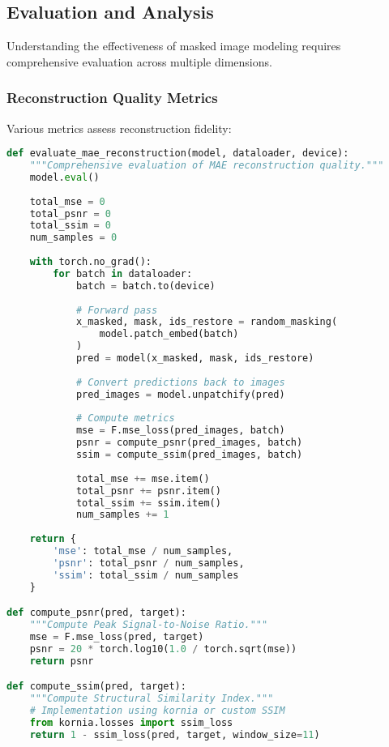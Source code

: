 \subsection{Evaluation and Analysis}

Understanding the effectiveness of masked image modeling requires comprehensive evaluation across multiple dimensions.

\subsubsection{Reconstruction Quality Metrics}

Various metrics assess reconstruction fidelity:

\begin{lstlisting}[language=Python, caption=Comprehensive evaluation of MAE reconstruction quality]
def evaluate_mae_reconstruction(model, dataloader, device):
    """Comprehensive evaluation of MAE reconstruction quality."""
    model.eval()
    
    total_mse = 0
    total_psnr = 0
    total_ssim = 0
    num_samples = 0
    
    with torch.no_grad():
        for batch in dataloader:
            batch = batch.to(device)
            
            # Forward pass
            x_masked, mask, ids_restore = random_masking(
                model.patch_embed(batch)
            )
            pred = model(x_masked, mask, ids_restore)
            
            # Convert predictions back to images
            pred_images = model.unpatchify(pred)
            
            # Compute metrics
            mse = F.mse_loss(pred_images, batch)
            psnr = compute_psnr(pred_images, batch)
            ssim = compute_ssim(pred_images, batch)
            
            total_mse += mse.item()
            total_psnr += psnr.item()
            total_ssim += ssim.item()
            num_samples += 1
    
    return {
        'mse': total_mse / num_samples,
        'psnr': total_psnr / num_samples,
        'ssim': total_ssim / num_samples
    }

def compute_psnr(pred, target):
    """Compute Peak Signal-to-Noise Ratio."""
    mse = F.mse_loss(pred, target)
    psnr = 20 * torch.log10(1.0 / torch.sqrt(mse))
    return psnr

def compute_ssim(pred, target):
    """Compute Structural Similarity Index."""
    # Implementation using kornia or custom SSIM
    from kornia.losses import ssim_loss
    return 1 - ssim_loss(pred, target, window_size=11)
\end{lstlisting}


